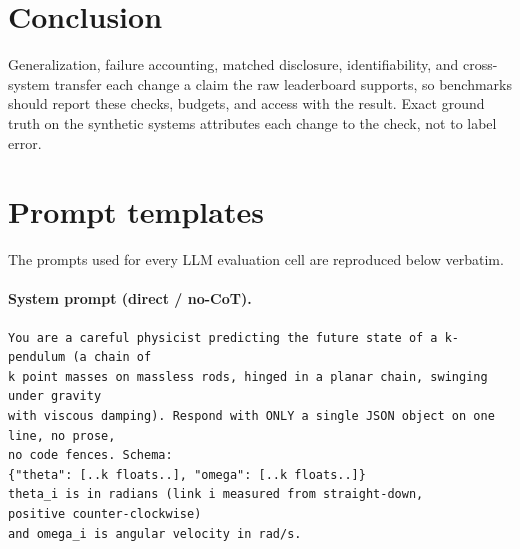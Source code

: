 \documentclass{article}
\begin{document}
\section{Conclusion}
Generalization, failure accounting, matched disclosure, identifiability, and cross-system
transfer each change a claim the raw leaderboard supports, so benchmarks should report these
checks, budgets, and access with the result. Exact ground truth on the synthetic systems
attributes each change to the check, not to label error.

%
%

\small



\appendix
\section{Prompt templates}
The prompts used for every LLM evaluation cell are reproduced below verbatim.

\paragraph{System prompt (direct / no-CoT).}
\begin{small}\begin{verbatim}
You are a careful physicist predicting the future state of a k-pendulum (a chain of
k point masses on massless rods, hinged in a planar chain, swinging under gravity
with viscous damping). Respond with ONLY a single JSON object on one line, no prose,
no code fences. Schema:
{"theta": [..k floats..], "omega": [..k floats..]}
theta_i is in radians (link i measured from straight-down,
positive counter-clockwise)
and omega_i is angular velocity in rad/s.
\end{verbatim}\end{small}
\end{document}
